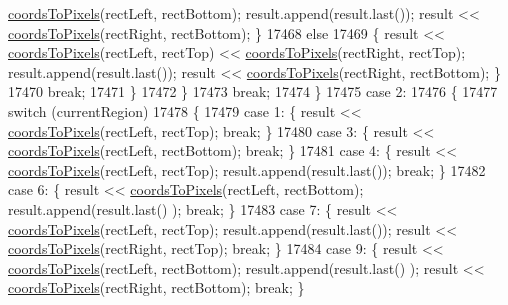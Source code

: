 \begin{DoxyCode}
      \hyperlink{class_q_c_p_abstract_plottable_ade710a776104b14c1c835168ce1bfc5c}{coordsToPixels}(rectLeft, rectBottom); result.append(result.last()); result << 
      \hyperlink{class_q_c_p_abstract_plottable_ade710a776104b14c1c835168ce1bfc5c}{coordsToPixels}(rectRight, rectBottom); \}
17468           \textcolor{keywordflow}{else}
17469           \{ result << \hyperlink{class_q_c_p_abstract_plottable_ade710a776104b14c1c835168ce1bfc5c}{coordsToPixels}(rectLeft, rectTop) << 
      \hyperlink{class_q_c_p_abstract_plottable_ade710a776104b14c1c835168ce1bfc5c}{coordsToPixels}(rectRight, rectTop); result.append(result.last()); result << 
      \hyperlink{class_q_c_p_abstract_plottable_ade710a776104b14c1c835168ce1bfc5c}{coordsToPixels}(rectRight, rectBottom); \}
17470           \textcolor{keywordflow}{break};
17471         \}
17472       \}
17473       \textcolor{keywordflow}{break};
17474     \}
17475     \textcolor{keywordflow}{case} 2:
17476     \{
17477       \textcolor{keywordflow}{switch} (currentRegion)
17478       \{
17479         \textcolor{keywordflow}{case} 1: \{ result << \hyperlink{class_q_c_p_abstract_plottable_ade710a776104b14c1c835168ce1bfc5c}{coordsToPixels}(rectLeft, rectTop); \textcolor{keywordflow}{break}; \}
17480         \textcolor{keywordflow}{case} 3: \{ result << \hyperlink{class_q_c_p_abstract_plottable_ade710a776104b14c1c835168ce1bfc5c}{coordsToPixels}(rectLeft, rectBottom); \textcolor{keywordflow}{break}; \}
17481         \textcolor{keywordflow}{case} 4: \{ result << \hyperlink{class_q_c_p_abstract_plottable_ade710a776104b14c1c835168ce1bfc5c}{coordsToPixels}(rectLeft, rectTop); result.append(result.last()); \textcolor{keywordflow}{
      break}; \}
17482         \textcolor{keywordflow}{case} 6: \{ result << \hyperlink{class_q_c_p_abstract_plottable_ade710a776104b14c1c835168ce1bfc5c}{coordsToPixels}(rectLeft, rectBottom); result.append(result.last()
      ); \textcolor{keywordflow}{break}; \}
17483         \textcolor{keywordflow}{case} 7: \{ result << \hyperlink{class_q_c_p_abstract_plottable_ade710a776104b14c1c835168ce1bfc5c}{coordsToPixels}(rectLeft, rectTop); result.append(result.last()); 
      result << \hyperlink{class_q_c_p_abstract_plottable_ade710a776104b14c1c835168ce1bfc5c}{coordsToPixels}(rectRight, rectTop); \textcolor{keywordflow}{break}; \}
17484         \textcolor{keywordflow}{case} 9: \{ result << \hyperlink{class_q_c_p_abstract_plottable_ade710a776104b14c1c835168ce1bfc5c}{coordsToPixels}(rectLeft, rectBottom); result.append(result.last()
      ); result << \hyperlink{class_q_c_p_abstract_plottable_ade710a776104b14c1c835168ce1bfc5c}{coordsToPixels}(rectRight, rectBottom); \textcolor{keywordflow}{break}; \}

\end{DoxyCode}
